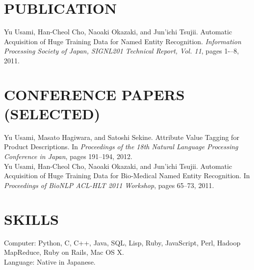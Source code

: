 \documentclass[10pt]{res}
\begin{document}
\begin{resume}
\section{\uppercase{Publication}}
Yu Usami, Han-Cheol Cho, Naoaki Okazaki, and Jun'ichi Tsujii. Automatic Acquisition of Huge Training Data for Named Entity Recognition. \textit{Information Processing Society of Japan, SIGNL201 Technical Report, Vol. 11}, pages 1-–8, 2011.

\section{\uppercase{Conference Papers (Selected)}}
Yu Usami, Masato Hagiwara, and Satoshi Sekine. Attribute Value Tagging for Product Descriptions. In \textit{Proceedings of the 18th Natural Language Processing Conference in Japan}, pages 191--194, 2012.\\
Yu Usami, Han-Cheol Cho, Naoaki Okazaki, and Jun'ichi Tsujii. Automatic Acquisition of Huge Training Data for Bio-Medical Named Entity Recognition. In \textit{Proceedings of BioNLP ACL-HLT 2011 Workshop}, pages 65--73, 2011.

\section{\uppercase{Skills}}
Computer: Python, C, C++, Java, SQL, Lisp, Ruby, JavaScript, Perl, Hadoop MapReduce, Ruby on Rails, Mac OS X.\\
Language: Native in Japanese.

\end{resume}
\end{document}
